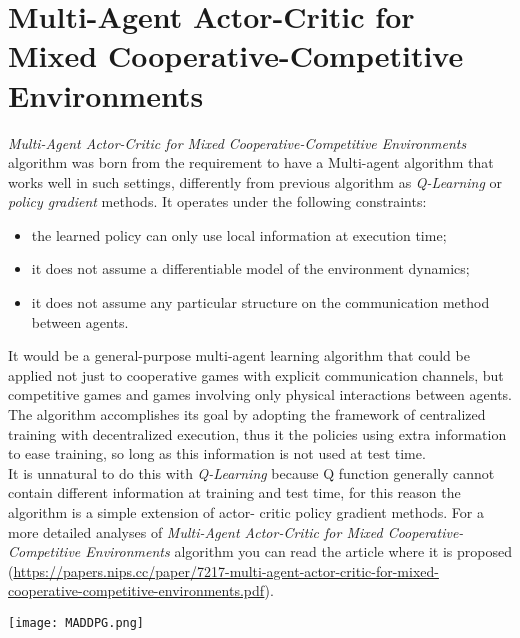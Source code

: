 \documentclass[]{report}
\begin{document}
\section{Multi-Agent Actor-Critic for Mixed	Cooperative-Competitive Environments}
\emph{Multi-Agent Actor-Critic for Mixed Cooperative-Competitive Environments} algorithm was born from the requirement to have a Multi-agent algorithm that works well in such settings, differently from previous algorithm as \emph{Q-Learning} or \emph{policy gradient} methods.
It operates under the following constraints:
\begin{itemize}
	\item the learned policy can only use local information at execution time;
	\item it does not assume a differentiable model of the environment dynamics;
	\item it does not assume any particular structure on the communication method between agents.
\end{itemize}

\vspace{5 mm}

It would be a general-purpose multi-agent learning algorithm that could be applied not just to cooperative games with explicit communication channels, but competitive games and games involving only physical interactions between agents.
The algorithm accomplishes its goal by adopting the framework of centralized training with decentralized execution, thus it the policies using extra information to ease training, so long as this information is not used at test time.\\
It is unnatural to do this with \emph{Q-Learning} because Q function generally cannot contain different information at training and test time, for this reason the algorithm is a simple extension of actor- critic policy gradient methods.
For a more detailed analyses of \emph{Multi-Agent Actor-Critic for Mixed Cooperative-Competitive Environments} algorithm you can read the article where it is proposed    (\url{https://papers.nips.cc/paper/7217-multi-agent-actor-critic-for-mixed-cooperative-competitive-environments.pdf}).

\begin{center}
	\texttt{[image: MADDPG.png]}
\end{center}

\vspace{10 mm}
\end{document}
